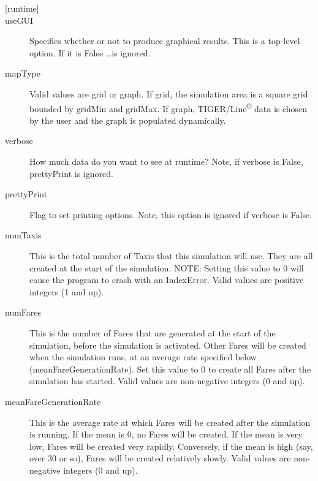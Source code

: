 \documentclass[11pt,letterpaper,onecolumn,twoside,openright,final]{report}
\begin{document}
\vspace{0.5cm}
\begin{description}
\item[{[runtime]}]

\item[useGUI]Specifies whether or not to produce graphical results.
This is a top-level option.
If it is False \ldots is ignored.

\item[mapType]Valid values are grid or graph.
If grid, the simulation area is a square grid bounded by gridMin and gridMax.
If graph, TIGER/Line\textsuperscript{\tiny{\copyright}} data is chosen by the user and the graph is populated dynamically.

\item[verbose] How much data do you want to see at runtime?
Note, if verbose is False, prettyPrint is ignored.

\item[prettyPrint]Flag to set printing options.
Note, this option is ignored if verbose is False.

\item[numTaxis]This is the total number of Taxis that this simulation will use.
They are all created at the start of the simulation.
NOTE: Setting this value to 0 will cause the program to crash with an IndexError.
Valid values are positive integers (1 and up).

\item[numFares]This is the number of Fares that are generated at the start of the simulation, before the simulation is activated.
Other Fares will be created when the simulation runs, at an average rate specified below (meanFareGenerationRate).
Set this value to 0 to create all Fares after the simulation has started.
Valid values are non-negative integers (0 and up).

\item[meanFareGenerationRate]This is the average rate at which Fares will be created after the simulation is running.
If the mean is 0, no Fares will be created.
If the mean is very low, Fares will be created very rapidly.
Conversely, if the mean is high (say, over 30 or so), Fares will be created relatively slowly.
Valid values are non-negative integers (0 and up).


\end{description}
\end{document}

